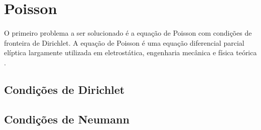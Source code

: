 \documentclass[poisson.tex]{subfiles}
\begin{document}
\section{Poisson}
\paragraph{} O primeiro problema a ser solucionado é a equação de Poisson com condições de fronteira de Dirichlet. A equação de Poisson é uma equação diferencial parcial elíptica largamente utilizada em eletrostática, engenharia mecânica e física teórica \cite{poissonWiki}.
\subsection{Condições de Dirichlet}

\subsection{Condições de Neumann}
\end{document}
